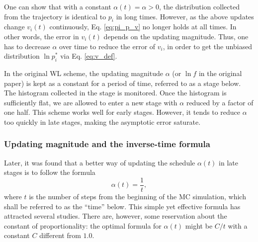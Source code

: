 \documentclass[reprint, floatfix]{revtex4-1}
\begin{document}
One can show that with a constant $\alpha(t) = \alpha > 0$,
the distribution collected from
the trajectory is identical to $p_i$ in long times.
%
However, as the above updates
change $v_i(t)$ continuously,
Eq. \eqref{eq:pi_p_v} no longer holds
at all times.
%
In other words,
the error in $v_i(t)$
depends on the updating magnitude\cite{
  zhou2005, liang2005, laio2005, bussi2006, poulain2006, liang2007,
  morozov2007, zhou2008, morozov2009, crespo2010,
  atchade2011, fort2015}.
%
Thus, one has to decrease $\alpha$ over time
to reduce the error of $v_i$,
in order to get the unbiased distribution
$\ln p_i^*$ via Eq. \eqref{eq:v_def}.





In the original WL scheme,
the updating magnitude $\alpha$ (or $\ln f$
in the original paper) is kept as a constant
for a period of time,
referred to as a stage below.
%
The histogram collected in the stage is monitored.
%
Once the histogram is sufficiently flat,
we are allowed to enter a new stage
with $\alpha$
reduced by a factor of one
half\cite{wang2001, wang2001pre}.
%
This scheme works well for early stages.
%
However, it tends to reduce $\alpha$
too quickly in late stages, making the asymptotic error
saturate\cite{belardinelli2007, belardinelli2007jcp, belardinelli2008}.
%




\subsubsection{Updating magnitude and the inverse-time formula}



Later,
it was found that
a better way
of updating the schedule $\alpha(t)$
in late stages
is to follow the formula
%
\begin{equation}
  \alpha(t) = \frac{1}{t},
  \label{eq:alpha_invt}
\end{equation}
%
where $t$ is the number of steps
from the beginning of the MC simulation,
which shall be referred to as the ``time'' below.
%
This simple yet effective formula has attracted
several studies\cite{belardinelli2007, belardinelli2007jcp, belardinelli2008,
morozov2007, zhou2008, morozov2009,
komura2012, caparica2012, caparica2014}.
%
There are, however, some reservation about
the constant of proportionality:
the optimal formula for $\alpha(t)$
might be $C/t$ with a constant $C$
different from $1.0$\cite{
morozov2007, zhou2008, morozov2009}.
\end{document}
